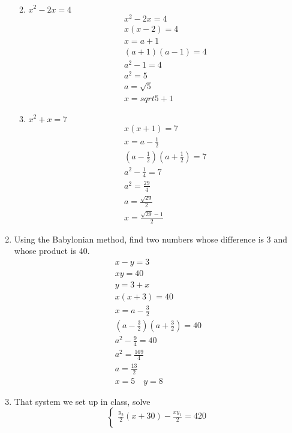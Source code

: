 \documentclass[12pt]{article}
\begin{document}
\begin{enumerate}
\begin{enumerate}
\begin{gather*}
        \end{gather*}
        \item $x^2-2x=4$
        \begin{gather*}
            x^2-2x=4 \\
            x(x-2)=4 \\
            x=a+1 \\
            (a+1)(a-1)=4 \\
            a^2-1=4 \\
            a^2=5 \\
            a=\sqrt5 \\
            x=sqrt5+1
        \end{gather*}
        \item $x^2+x=7$
        \begin{gather*}
            x(x+1)=7 \\
            x=a-\frac{1}{2} \\
            (a-\frac{1}{2})(a+\frac{1}{2})=7 \\
            a^2-\frac{1}{4}=7 \\
            a^2=\frac{29}{4} \\
            a=\frac{\sqrt{29}}{2} \\
            x=\frac{\sqrt{29}-1}{2}
        \end{gather*}
    \end{enumerate}
    \item Using the Babylonian method, find two numbers whose difference is 3 and whose 
    product is 40. 
    \begin{gather*}
        x-y=3 \\
        xy=40 \\
        y=3+x \\
        x(x+3)=40 \\
        x=a-\frac{3}{2} \\
        (a-\frac{3}{2})(a+\frac{3}{2})=40 \\
        a^2-\frac{9}{4}=40 \\
        a^2=\frac{169}{4} \\
        a=\frac{13}{2} \\
        x=5 \quad y=8
    \end{gather*}
    \item That system we set up in class, solve
    \begin{equation*}    
        \begin{cases}
            \displaystyle\frac{y_2}{2}{(x+30)}-\displaystyle\frac{xy_1}{2}=420 \\

\end{cases}
\end{equation*}
\end{enumerate}
\end{document}

